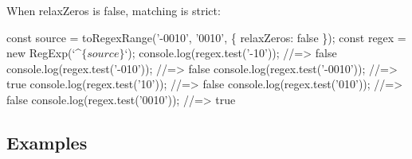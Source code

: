 When {\ttfamily relax\+Zeros} is false, matching is strict\+:


\begin{DoxyCode}
const source = toRegexRange('-0010', '0010', \{ relaxZeros: false \});
const regex = new RegExp(`^$\{source\}$`);
console.log(regex.test('-10')); //=> false
console.log(regex.test('-010')); //=> false
console.log(regex.test('-0010')); //=> true
console.log(regex.test('10')); //=> false
console.log(regex.test('010')); //=> false
console.log(regex.test('0010')); //=> true
\end{DoxyCode}


\subsection*{Examples}

\tabulinesep=1mm
